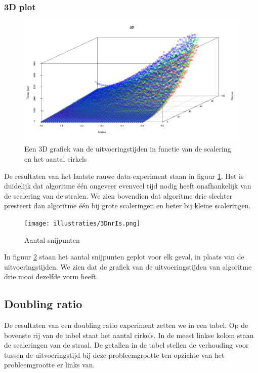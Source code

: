 \subsubsection{3D plot}
\begin{figure}[H]
   	\centering
   	\includegraphics[width=\textwidth]{illustraties/3DScatter.png}
  	\caption{Een 3D grafiek van de uitvoeringstijden in functie van de scalering en het aantal cirkels}
	\label{fig:3d}
\end{figure}
De resultaten van het laatste rauwe data-experiment staan in figuur \ref{fig:3d}.
Het is duidelijk dat algoritme \'e\'en ongeveer evenveel tijd nodig heeft onafhankelijk van de scalering van de stralen. We zien bovendien dat algoritme drie slechter presteert dan algoritme \'e\'en bij grote scaleringen en beter bij kleine scaleringen.

\begin{figure}[H]
   	\centering
   	\texttt{[image: illustraties/3DnrIs.png]}
  	\caption{Aantal snijpunten}
  	\label{fig:nr_intersections}
\end{figure}

In figuur \ref{fig:nr_intersections} staan het aantal snijpunten geplot voor elk geval, in plaats van de uitvoeringstijden. We zien dat de grafiek van de uitvoeringstijden van algoritme drie mooi dezelfde vorm heeft.

\subsection{Doubling ratio}
De resultaten van een doubling ratio experiment zetten we in een tabel. Op de bovenste rij van de tabel staat het aantal cirkels. In de meest linkse kolom staan de scaleringen van de straal. De getallen in de tabel stellen de verhouding voor tussen de uitvoeringstijd bij deze probleemgrootte ten opzichte van het probleemgrootte er links van.

